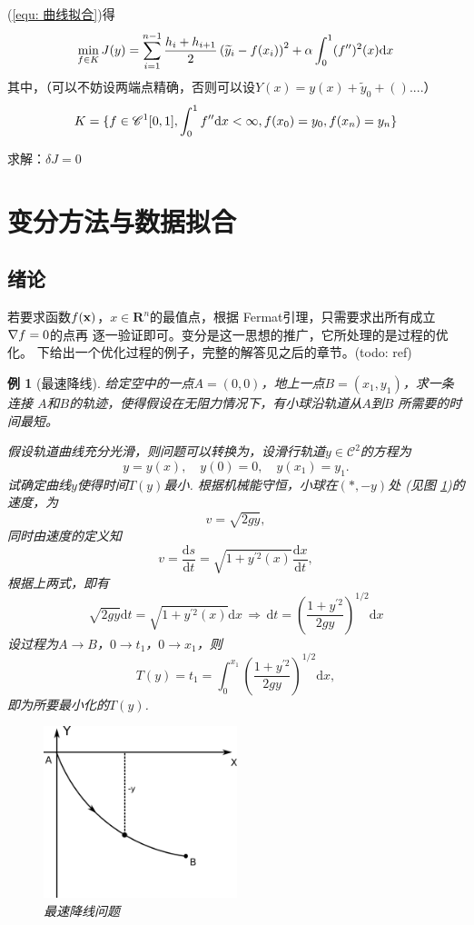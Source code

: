 \documentclass[12pt, a4paper]{article}
\theoremstyle{margin}
\newtheorem{exa}[thm]{例}
\newcommand{\pr}{\prime}
\newcommand{\ms}{\mathscr}
\newcommand{\mbf}{\mathbf}
\newcommand{\f}{\mathnormal{f}}
\newcommand{\R}{\mathbf{R}}
\newcommand{\rd}{\mathrm{d}}
\newcommand\equref[1]{(\ref{#1})}
\newcommand\figref[1]{图 \ref{#1}}
\begin{document}
    \equref{equ: 曲线拟合}得
    \[
      \min_{f\in K} J(y) = \sum_{i=1}^{n-1}\frac{h_i + h_{i+1}}{2}
      \left( \widetilde{y}_i - \f(x_i) \right)^2 + \alpha
      \int_0^1 (\f^{\pr\pr})^2(x) \rd x
    \]
    其中，（可以不妨设两端点精确，否则可以设$Y(x) = y(x)+\widetilde{y}_0
    +()....$）
    \[
      K = \{\f\in\ms{C}^1[0,1], \int_0^1\f^{\pr\pr}\rd x<\infty,
      \f(x_0) = y_0, \f(x_n) = y_n\}
    \]

    求解：$\delta J = 0$

\newpage
\section{变分方法与数据拟合}
\subsection{绪论}
  若要求函数$\f(\mbf{x})$，$x\in\R^n$的最值点，根据
  Fermat引理，只需要求出所有成立$\nabla\f = 0$的点再
  逐一验证即可。变分是这一思想的推广，它所处理的是过程的优化。
  下给出一个优化过程的例子，完整的解答见之后的章节。(todo: ref)

  \begin{exa}[最速降线]
    给定空中的一点$A=(0,0)$，地上一点$B=(x_1,y_1)$，求一条连接
    $A$和$B$的轨迹，使得假设在无阻力情况下，有小球沿轨道从$A$到$B$
    所需要的时间最短。\par
    假设轨道曲线充分光滑，则问题可以转换为，设滑行轨道$y\in\ms{C}^2$的方程为
    \[
      y=y(x), \quad y(0)=0,\quad y(x_1) = y_1.
    \]
    试确定曲线$y$使得时间$T(y)$最小. 根据机械能守恒，小球在$(*,-y)$处
    (见\figref{fig: 最速降线问题})的速度，为
    \[
      v = \sqrt{2gy},
    \]
    同时由速度的定义知
    \[
      v = \frac{\rd s}{\rd t} = \sqrt{1+y^{\pr2}(x)}\frac{\rd x}{\rd t},
    \]
    根据上两式，即有
    \[
      \sqrt{2gy}\rd t = \sqrt{1+y^{\pr2}(x)}\rd x \,\Rightarrow\,
      \rd t = \left( \frac{1+y^{\pr2}}{2gy} \right)^{1/2}\rd x
    \]
    设过程为$A\to B$，$0\to t_1$，$0\to x_1$，则
    \[
      T(y) = t_1 = \int_0^{x_1} \left( \frac{1+y^{\pr2}}{2gy} \right)^{1/2}\rd x,
    \]
    即为所要最小化的$T(y)$.
    \begin{figure}[htbp]
      \centering
      \includegraphics[height=5cm]{../image/brachistochrone.png}
      \caption{最速降线问题}
      \label{fig: 最速降线问题}
    \end{figure}
  \end{exa}
\end{document}
